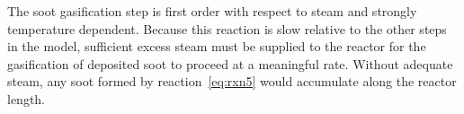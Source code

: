 The soot gasification step is first order with respect to steam and strongly temperature dependent. Because this reaction is slow relative to the other steps in the model, sufficient excess steam must be supplied to the reactor for the gasification of deposited soot to proceed at a meaningful rate. Without adequate steam, any soot formed by reaction~\eqref{eq:rxn5} would accumulate along the reactor length.
